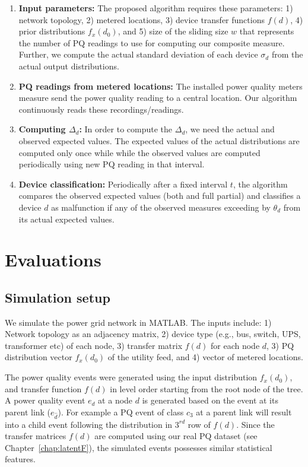 \begin{enumerate}
\item \textbf{Input parameters:} The proposed algorithm requires these parameters: 1) network topology, 2) metered locations, 3) device transfer functions $f(d)$, 4) prior distributions $f_x(d_0)$, and 5) size of the sliding size $w$ that represents the number of PQ readings to use for computing our composite measure. Further, we compute the actual standard deviation of each device $\sigma_d$ from the actual output distributions.
\item \textbf{PQ readings from metered locations:} The installed power quality meters measure send the power quality reading to a central location. Our algorithm continuously reads these recordings/readings.
\item \textbf{Computing $\Delta_d$:} In order to compute the $\Delta_d$, we need the actual and observed expected values. The expected values of the actual distributions are computed only once while while the observed values are computed periodically using new PQ reading in that interval.
\item \textbf{Device classification:} Periodically after a fixed interval $t$, the algorithm compares the observed expected values (both and full partial) and classifies a device $d$ as malfunction if any of the observed measures exceeding by $\theta_d$ from its actual expected values.
\end{enumerate}


\section{Evaluations}
\subsection{Simulation setup}
We simulate the power grid network in MATLAB. The inputs include: 1) Network topology as an adjacency matrix, 2) device type (e.g., bus, switch, UPS, transformer etc) of each node, 3) transfer matrix $f(d)$ for each node $d$, 3) PQ distribution vector $f_x(d_0)$ of the utility feed, and 4) vector of metered locations.

The power quality events were generated using the input distribution $f_x(d_0)$, and transfer function $f(d)$ in level order starting from the root node of the tree. A power quality event $e_d$ at a node $d$ is generated based on the event at its parent link ($e_{\widehat d}$). For example a PQ event of class $c_3$ at a parent link will result into a child event following the distribution in $3^{rd}$ row of $f(d)$. Since the transfer matrices $f(d)$ are computed using our real PQ dataset (see Chapter~\ref{chap:latentF}), the simulated events possesses similar statistical features.

